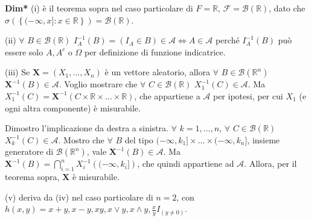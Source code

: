 \documentclass{article}
\begin{document}
\textbf{Dim*} (i) \`{e} il teorema sopra nel caso particolare di $F=%
\mathbb{R}
$, $\mathcal{F=B}\left( 
\mathbb{R}
\right) $, dato che $\sigma \left( \left\{ (-\infty ,x]:x\in 
\mathbb{R}
\right\} \right) =\mathcal{B}\left( 
\mathbb{R}
\right) $.

(ii) $\forall $ $B\in \mathcal{B}\left( 
\mathbb{R}
\right) $ $I_{A}^{-1}\left( B\right) =\left( I_{A}\in B\right) \in \mathcal{A%
}\Longleftrightarrow A\in \mathcal{A}$ perch\'{e} $I_{A}^{-1}\left( B\right) 
$ pu\`{o} essere solo $A,A^{c}$ o $\Omega $ per definizione di funzione
indicatrice.

(iii) Se $\mathbf{X}=\left( X_{1},...,X_{n}\right) $ \`{e} un vettore
aleatorio, allora $\forall $ $B\in \mathcal{B}\left( 
\mathbb{R}
^{n}\right) $ $\mathbf{X}^{-1}\left( B\right) \in \mathcal{A}$. Voglio
mostrare che $\forall $ $C\in \mathcal{B}\left( 
\mathbb{R}
\right) $ $X_{1}^{-1}\left( C\right) \in \mathcal{A}$. Ma $X_{1}^{-1}\left(
C\right) =\mathbf{X}^{-1}\left( C\times 
\mathbb{R}
\times ...\times 
\mathbb{R}
\right) $, che appartiene a $\mathcal{A}$ per ipotesi, per cui $X_{1}$ (e
ogni altra componente) \`{e} misurabile.

Dimostro l'implicazione da destra a sinistra. $\forall $ $k=1,...,n$, $%
\forall $ $C\in \mathcal{B}\left( 
\mathbb{R}
\right) $ $X_{k}^{-1}\left( C\right) \in \mathcal{A}$. Mostro che $\forall $ 
$B$ del tipo $(-\infty ,k_{1}]\times ...\times (-\infty ,k_{n}]$, insieme
generatore di $\mathcal{B}\left( 
\mathbb{R}
^{n}\right) $, vale $\mathbf{X}^{-1}\left( B\right) \in \mathcal{A}$. Ma $%
\mathbf{X}^{-1}\left( B\right) =\bigcap_{i=1}^{n}X_{i}^{-1}\left( (-\infty
,k_{i}]\right) $, che quindi appartiene ad $\mathcal{A}$. Allora, per il
teorema sopra, $\mathbf{X}$ \`{e} misurabile.

(v) deriva da (iv) nel caso particolare di $n=2$, con $h\left( x,y\right)
=x+y,x-y,xy,x\vee y,x\wedge y,\frac{x}{y}I_{\left( y\neq 0\right) }$.
\end{document}
